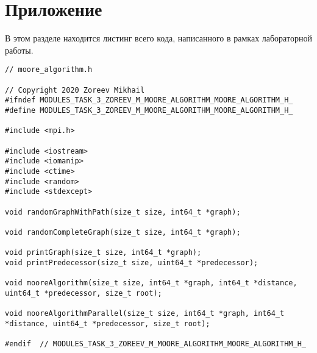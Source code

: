 \documentclass{report}
\begin{document}
\section*{Приложение}
В этом разделе находится листинг всего кода, написанного в рамках лабораторной работы.
\begin{lstlisting}
// moore_algorithm.h

// Copyright 2020 Zoreev Mikhail
#ifndef MODULES_TASK_3_ZOREEV_M_MOORE_ALGORITHM_MOORE_ALGORITHM_H_
#define MODULES_TASK_3_ZOREEV_M_MOORE_ALGORITHM_MOORE_ALGORITHM_H_

#include <mpi.h>

#include <iostream>
#include <iomanip>
#include <ctime>
#include <random>
#include <stdexcept>

void randomGraphWithPath(size_t size, int64_t *graph);

void randomCompleteGraph(size_t size, int64_t *graph);

void printGraph(size_t size, int64_t *graph);
void printPredecessor(size_t size, uint64_t *predecessor);

void mooreAlgorithm(size_t size, int64_t *graph, int64_t *distance, uint64_t *predecessor, size_t root);

void mooreAlgorithmParallel(size_t size, int64_t *graph, int64_t *distance, uint64_t *predecessor, size_t root);

#endif  // MODULES_TASK_3_ZOREEV_M_MOORE_ALGORITHM_MOORE_ALGORITHM_H_
\end{lstlisting}
\end{document}
